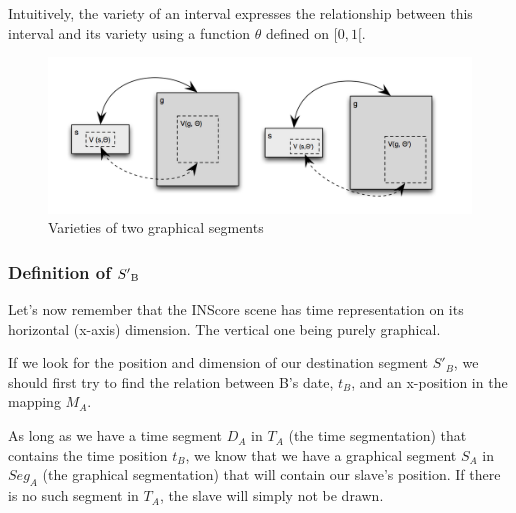 \documentclass[a4paper]{article}
\begin{document}
Intuitively, the variety of an interval expresses the relationship between this interval and its variety using a function $\theta$ defined on $[0, 1[$.
\\
\begin{figure}[h]
\includegraphics[width=15cm]{img/variety.png}
\caption{Varieties of two graphical segments}
\label{fig:variety}
\end{figure}


\subsubsection{Definition of $S'\textsubscript{B}$}\label{subsubsec:defDestRect}


Let's now remember that the INScore scene has time representation on its horizontal (x-axis) dimension. The vertical one being purely graphical.

If we look for the position and dimension of our destination segment $S'_B$, we should first try to find the relation between B's date, $t_B$, and an x-position in the mapping $M_A$. 

As long as we have a time segment $D_A$ in $T_A$ (the time segmentation) that contains the time position $t_B$, we know that we have a graphical segment $S_A$ in $Seg_A$ (the graphical segmentation) that will contain our slave's position. If there is no such segment in $T_A$, the slave will simply not be drawn.
\end{document}
